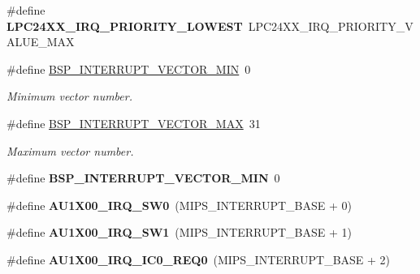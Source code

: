 \begin{DoxyCompactItemize}
\#define {\bfseries L\+P\+C24\+X\+X\+\_\+\+I\+R\+Q\+\_\+\+P\+R\+I\+O\+R\+I\+T\+Y\+\_\+\+L\+O\+W\+E\+ST}~L\+P\+C24\+X\+X\+\_\+\+I\+R\+Q\+\_\+\+P\+R\+I\+O\+R\+I\+T\+Y\+\_\+\+V\+A\+L\+U\+E\+\_\+\+M\+AX
\item 
\mbox{\label{group__bsp__interrupt_ga64cbb02dfea4d6923abccaa0087d2a0d}} 
\#define \mbox{\hyperlink{group__bsp__interrupt_ga64cbb02dfea4d6923abccaa0087d2a0d}{B\+S\+P\+\_\+\+I\+N\+T\+E\+R\+R\+U\+P\+T\+\_\+\+V\+E\+C\+T\+O\+R\+\_\+\+M\+IN}}~0
\begin{DoxyCompactList}\small\item\em Minimum vector number. \end{DoxyCompactList}\item 
\mbox{\label{group__bsp__interrupt_gae4a2cdda5816a4c83c2fac0a49880c6e}} 
\#define \mbox{\hyperlink{group__bsp__interrupt_gae4a2cdda5816a4c83c2fac0a49880c6e}{B\+S\+P\+\_\+\+I\+N\+T\+E\+R\+R\+U\+P\+T\+\_\+\+V\+E\+C\+T\+O\+R\+\_\+\+M\+AX}}~31
\begin{DoxyCompactList}\small\item\em Maximum vector number. \end{DoxyCompactList}\item 
\mbox{\label{group__bsp__interrupt_ga64cbb02dfea4d6923abccaa0087d2a0d}} 
\#define {\bfseries B\+S\+P\+\_\+\+I\+N\+T\+E\+R\+R\+U\+P\+T\+\_\+\+V\+E\+C\+T\+O\+R\+\_\+\+M\+IN}~0
\item 
\mbox{\label{group__bsp__interrupt_ga0318977f409798779a4f29b6e0ca4a57}} 
\#define {\bfseries A\+U1\+X00\+\_\+\+I\+R\+Q\+\_\+\+S\+W0}~(M\+I\+P\+S\+\_\+\+I\+N\+T\+E\+R\+R\+U\+P\+T\+\_\+\+B\+A\+SE + 0)
\item 
\mbox{\label{group__bsp__interrupt_ga24762983a7e49ad274c1d9aa2d0e1d17}} 
\#define {\bfseries A\+U1\+X00\+\_\+\+I\+R\+Q\+\_\+\+S\+W1}~(M\+I\+P\+S\+\_\+\+I\+N\+T\+E\+R\+R\+U\+P\+T\+\_\+\+B\+A\+SE + 1)
\item 
\mbox{\label{group__bsp__interrupt_gaee5bfa6f324e14a2c7f4b62fd9b14b5d}} 
\#define {\bfseries A\+U1\+X00\+\_\+\+I\+R\+Q\+\_\+\+I\+C0\+\_\+\+R\+E\+Q0}~(M\+I\+P\+S\+\_\+\+I\+N\+T\+E\+R\+R\+U\+P\+T\+\_\+\+B\+A\+SE + 2)
\item 

\end{DoxyCompactItemize}
